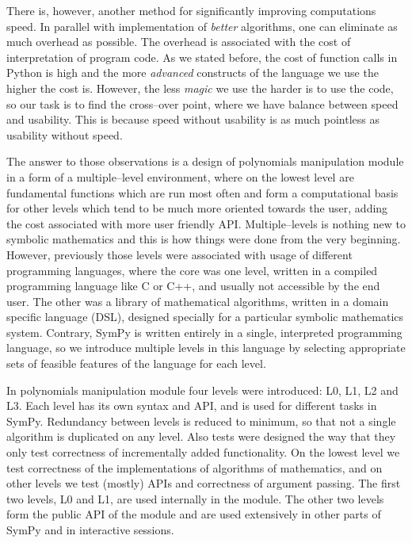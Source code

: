 There is, however, another method for significantly improving computations speed. In parallel with
implementation of \emph{better} algorithms, one can eliminate as much overhead as possible. The overhead
is associated with the cost of interpretation of program code. As we stated before, the cost of
function calls in Python is high and the more \emph{advanced} constructs of the language we use the
higher the cost is. However, the less \emph{magic} we use the harder is to use the code, so our task
is to find the cross--over point, where we have balance between speed and usability. This is
because speed without usability is as much pointless as usability without speed.

The answer to those observations is a design of polynomials manipulation module in a form of a
multiple--level environment, where on the lowest level are fundamental functions which are run
most often and form a computational basis for other levels which tend to be much more oriented
towards the user, adding the cost associated with more user friendly API. Multiple--levels is
nothing new to symbolic mathematics and this is how things were done from the very beginning.
However, previously those levels were associated with usage of different programming languages,
where the core was one level, written in a compiled programming language like C or C++, and
usually not accessible by the end user. The other was a library of mathematical algorithms,
written in a domain specific language (DSL), designed specially for a particular symbolic
mathematics system. Contrary, SymPy is written entirely in a single, interpreted programming
language, so we introduce multiple levels in this language by selecting appropriate sets of
feasible features of the language for each level.

In polynomials manipulation module four levels were introduced: L0, L1, L2 and L3. Each level
has its own syntax and API, and is used for different tasks in SymPy. Redundancy between
levels is reduced to minimum, so that not a single algorithm is duplicated on any level. Also
tests were designed the way that they only test correctness of incrementally added functionality.
On the lowest level we test correctness of the implementations of algorithms of mathematics, and
on other levels we test (mostly) APIs and correctness of argument passing. The first two levels,
L0 and L1, are used internally in the module. The other two levels form the public API of the
module and are used extensively in other parts of SymPy and in interactive sessions.


